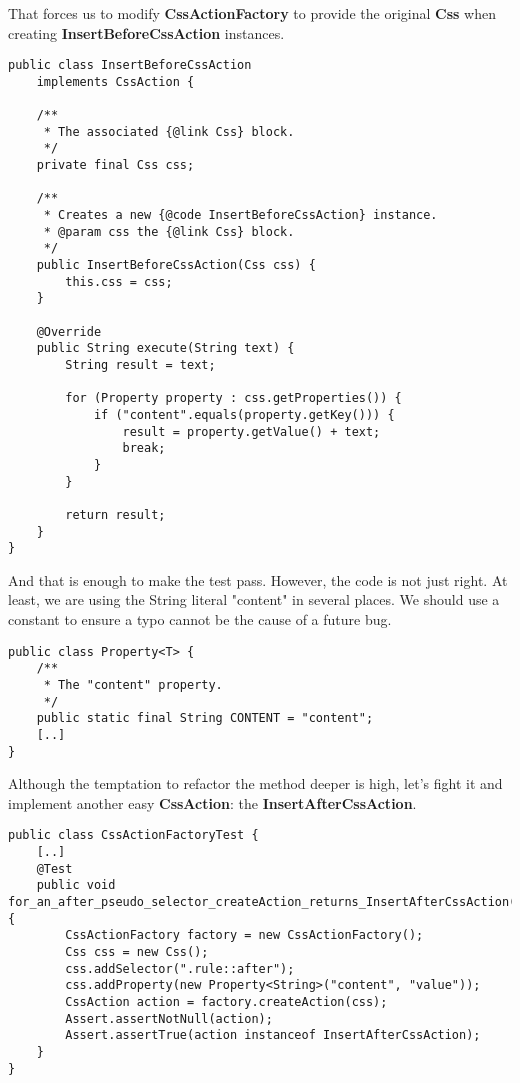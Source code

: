 \documentclass[11pt]{article}
\begin{document}
That forces us to modify \textbf{CssActionFactory} to provide the original \textbf{Css}
when creating \textbf{InsertBeforeCssAction} instances.

\begin{verbatim}
public class InsertBeforeCssAction
    implements CssAction {

    /**
     * The associated {@link Css} block.
     */
    private final Css css;

    /**
     * Creates a new {@code InsertBeforeCssAction} instance.
     * @param css the {@link Css} block.
     */
    public InsertBeforeCssAction(Css css) {
        this.css = css;
    }

    @Override
    public String execute(String text) {
        String result = text;

        for (Property property : css.getProperties()) {
            if ("content".equals(property.getKey())) {
                result = property.getValue() + text;
                break;
            }
        }

        return result;
    }
}
\end{verbatim}

And that is enough to make the test pass. However, the code is not just right.
At least, we are using the String literal "content" in several places. We should
use a constant to ensure a typo cannot be the cause of a future bug.

\begin{verbatim}
public class Property<T> {
    /**
     * The "content" property.
     */
    public static final String CONTENT = "content";
    [..]
}
\end{verbatim}

Although the temptation to refactor the method deeper is high, let's fight it
and implement another easy \textbf{CssAction}: the \textbf{InsertAfterCssAction}.

\begin{verbatim}
public class CssActionFactoryTest {
    [..]
    @Test
    public void for_an_after_pseudo_selector_createAction_returns_InsertAfterCssAction() {
        CssActionFactory factory = new CssActionFactory();
        Css css = new Css();
        css.addSelector(".rule::after");
        css.addProperty(new Property<String>("content", "value"));
        CssAction action = factory.createAction(css);
        Assert.assertNotNull(action);
        Assert.assertTrue(action instanceof InsertAfterCssAction);
    }
}
\end{verbatim}
\end{document}
